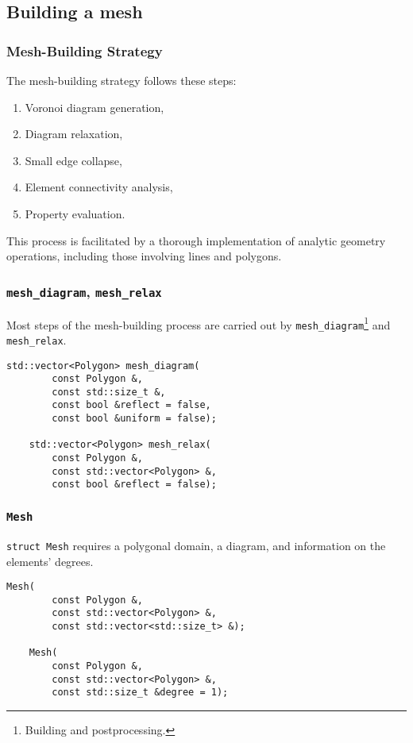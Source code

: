 \subsection{Building a mesh}

\begin{frame}
    \frametitle{Mesh-Building Strategy}

    The mesh-building strategy follows these steps:

    \begin{enumerate}
        \item Voronoi diagram generation,
        \item Diagram relaxation,
        \item Small edge collapse,
        \item Element connectivity analysis,
        \item Property evaluation.
    \end{enumerate}

    This process is facilitated by a thorough implementation of analytic geometry operations, including those involving lines and polygons.
\end{frame}

\begin{frame}[fragile]
    \frametitle{\lstinline{mesh_diagram}, \lstinline{mesh_relax}}

    Most steps of the mesh-building process are carried out by \lstinline{mesh_diagram}\footnote{Building and postprocessing.} and \lstinline{mesh_relax}.

    \begin{lstlisting}[style=cpp]
    std::vector<Polygon> mesh_diagram(
        const Polygon &, 
        const std::size_t &, 
        const bool &reflect = false, 
        const bool &uniform = false);

    std::vector<Polygon> mesh_relax(
        const Polygon &, 
        const std::vector<Polygon> &, 
        const bool &reflect = false);
    \end{lstlisting}

\end{frame}

\begin{frame}[fragile]
    \frametitle{\lstinline{Mesh}}

    \lstinline{struct Mesh} requires a polygonal domain, a diagram, and information on the elements' degrees.

    \begin{lstlisting}[style=cpp]
    Mesh(
        const Polygon &, 
        const std::vector<Polygon> &, 
        const std::vector<std::size_t> &);

    Mesh(
        const Polygon &, 
        const std::vector<Polygon> &, 
        const std::size_t &degree = 1);
    \end{lstlisting}

\end{frame}


